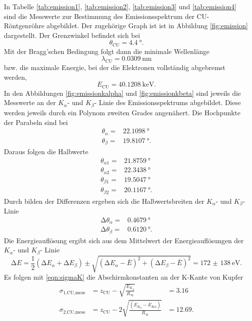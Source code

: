 In Tabelle \ref{tab:emission1}, \ref{tab:emission2}, \ref{tab:emission3} und
\ref{tab:emission4} sind die Messwerte zur Bestimmung des
Emissionsspektrum der CU-Röntgenröhre abgebildet. Der zugehörige Graph ist
ist in Abbildung \ref{fig:emission} dargestellt.
Der Grenzwinkel befindet sich bei
\begin{equation}
  \theta_\text{CU} = \SI{4.4}{\degree}.
\end{equation}
Mit der Bragg'schen Bedingung folgt dann die minimale Wellenlänge
\begin{equation}
  \lambda_\text{CU} = \SI{0.0309}{\nano\meter}
\end{equation}
bzw. die maximale Energie, bei der die Elektronen vollständig abgebremst werden,
\begin{equation}
  E_\text{CU} = \SI{40.1208}{\kilo\electronvolt}.
\end{equation}
In den Abbildungen \ref{fig:emissionkalpha} und \ref{fig:emissionkbeta} sind
jeweils die Messwerte an der $K_\alpha$- und $K_\beta$- Linie des
Emissionsspektrums abgebildet. Diese werden jeweils durch ein Polynom zweiten
Grades angenähert.
Die Hochpunkte der Parabeln sind bei
\begin{align}
  \theta_\alpha = & \SI{22.1098}{\degree} \\
  \theta_\beta = & \SI{19.8107}{\degree}.
\end{align}
Daraus folgen die Halbwerte
\begin{align}
  \theta_{\alpha 1} = & \SI{21.8759}{\degree} \\
  \theta_{\alpha 2} = & \SI{22.3438}{\degree} \\
  \theta_{\beta 1} = & \SI{19.5047}{\degree} \\
  \theta_{\beta 2} = & \SI{20.1167}{\degree}.
\end{align}
Durch bilden der Differenzen ergeben sich die Halbwertsbreiten der
$K_\alpha$- und $K_\beta$- Linie
\begin{align}
  \increment \theta_\alpha = & \SI{0.4679}{\degree} \\
  \increment \theta_\beta = & \SI{0.6120}{\degree}.
\end{align}
Die Energieauflösung ergibt sich aus dem Mittelwert der Energieauflösungen
der $K_\alpha$- und $K_\beta$- Linie
\begin{equation}
  \increment E = \frac{1}{2}(\increment E_\alpha + \increment E_\beta) \pm
  \sqrt{(\increment E_\alpha - \bar{E})^2 + (\increment E_\beta - \bar{E})^2}
  = \SI{172(138)}{\electronvolt}.
\end{equation}
Es folgen mit \eqref{eqn:sigmaK}
die Abschirmkonstanten an der K-Kante von Kupfer
\begin{align}
  \sigma_\text{1,CU,mess} & = z_\text{CU} - \sqrt{\frac{E_{K_\beta}}{R_\infty}} & = 3.16 \\
  \sigma_\text{2,CU,mess} & = z_\text{CU} - 2\sqrt{\frac{(E_{K_\beta}-E_{K\alpha})}{R_\infty}} & = 12.69.
\end{align}

